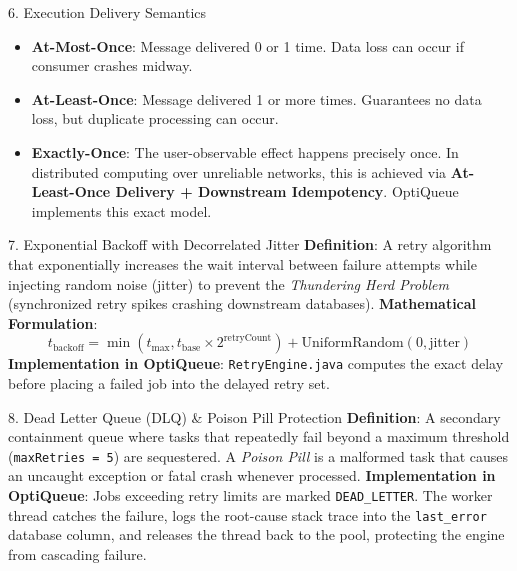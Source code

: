 \documentclass[11pt,a4paper]{article}
\begin{document}
\begin{conceptbox}{6. Execution Delivery Semantics}
\begin{itemize}[leftmargin=1.5em]
    \item \textbf{At-Most-Once}: Message delivered 0 or 1 time. Data loss can occur if consumer crashes midway.
    \item \textbf{At-Least-Once}: Message delivered 1 or more times. Guarantees no data loss, but duplicate processing can occur.
    \item \textbf{Exactly-Once}: The user-observable effect happens precisely once. In distributed computing over unreliable networks, this is achieved via \textbf{At-Least-Once Delivery + Downstream Idempotency}. OptiQueue implements this exact model.
\end{itemize}
\end{conceptbox}

\begin{conceptbox}{7. Exponential Backoff with Decorrelated Jitter}
\textbf{Definition}: A retry algorithm that exponentially increases the wait interval between failure attempts while injecting random noise (jitter) to prevent the \textit{Thundering Herd Problem} (synchronized retry spikes crashing downstream databases).
\textbf{Mathematical Formulation}:
\[ t_{\text{backoff}} = \min(t_{\text{max}}, t_{\text{base}} \times 2^{\text{retryCount}}) + \text{UniformRandom}(0, \text{jitter}) \]
\textbf{Implementation in OptiQueue}: \texttt{RetryEngine.java} computes the exact delay before placing a failed job into the delayed retry set.
\end{conceptbox}

\begin{conceptbox}{8. Dead Letter Queue (DLQ) \& Poison Pill Protection}
\textbf{Definition}: A secondary containment queue where tasks that repeatedly fail beyond a maximum threshold (\texttt{maxRetries = 5}) are sequestered. A \textit{Poison Pill} is a malformed task that causes an uncaught exception or fatal crash whenever processed.
\textbf{Implementation in OptiQueue}: Jobs exceeding retry limits are marked \texttt{DEAD\_LETTER}. The worker thread catches the failure, logs the root-cause stack trace into the \texttt{last\_error} database column, and releases the thread back to the pool, protecting the engine from cascading failure.
\end{conceptbox}
\end{document}
